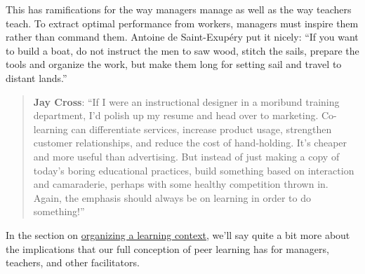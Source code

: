 This has ramifications for the way managers manage as well as the way
teachers teach. To extract optimal performance from workers, managers
must inspire them rather than command them. Antoine de Saint-Exupéry put
it nicely: ``If you want to build a boat, do not instruct the men to saw
wood, stitch the sails, prepare the tools and organize the work, but
make them long for setting sail and travel to distant lands.''

\begin{quote}
\textbf{Jay Cross}: ``If I were an instructional designer in a moribund
training department, I'd polish up my resume and head over to marketing.
Co-learning can differentiate services, increase product usage,
strengthen customer relationships, and reduce the cost of hand-holding.
It's cheaper and more useful than advertising. But instead of just
making a copy of today's boring educational practices, build something
based on interaction and camaraderie, perhaps with some healthy
competition thrown in. Again, the emphasis should always be on learning
in order to do something!''
\end{quote}
In the section on \href{http://peeragogy.org/organize/}{organizing a
learning context}, we'll say quite a bit more about the implications
that our full conception of peer learning has for managers, teachers,
and other facilitators.
